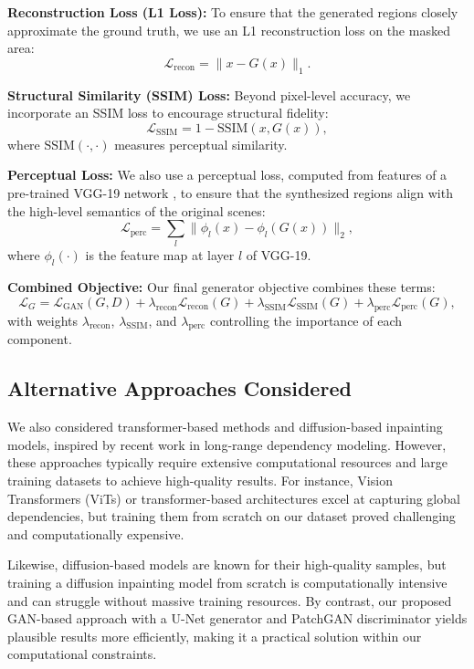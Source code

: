 \documentclass[sigconf]{acmart}
\begin{document}
\noindent\textbf{Reconstruction Loss (L1 Loss):}  
To ensure that the generated regions closely approximate the ground truth, we use an L1 reconstruction loss on the masked area:
\[
\mathcal{L}_{\text{recon}} = \| x - G(x) \|_1.
\]

\noindent\textbf{Structural Similarity (SSIM) Loss:}  
Beyond pixel-level accuracy, we incorporate an SSIM loss to encourage structural fidelity:
\[
\mathcal{L}_{\text{SSIM}} = 1 - \text{SSIM}(x, G(x)),
\]
where $\text{SSIM}(\cdot,\cdot)$ measures perceptual similarity.

\noindent\textbf{Perceptual Loss:}  
We also use a perceptual loss, computed from features of a pre-trained VGG-19 network \cite{Johnson2016}, to ensure that the synthesized regions align with the high-level semantics of the original scenes:
\[
\mathcal{L}_{\text{perc}} = \sum_{l} \| \phi_l(x) - \phi_l(G(x)) \|_2,
\]
where $\phi_l(\cdot)$ is the feature map at layer $l$ of VGG-19.

\noindent\textbf{Combined Objective:}  
Our final generator objective combines these terms:
\[
\mathcal{L}_{G} = \mathcal{L}_{\text{GAN}}(G,D) + \lambda_{\text{recon}}\mathcal{L}_{\text{recon}}(G) + \lambda_{\text{SSIM}}\mathcal{L}_{\text{SSIM}}(G) + \lambda_{\text{perc}}\mathcal{L}_{\text{perc}}(G),
\]
with weights $\lambda_{\text{recon}}$, $\lambda_{\text{SSIM}}$, and $\lambda_{\text{perc}}$ controlling the importance of each component.

\subsection*{Alternative Approaches Considered}

We also considered transformer-based methods and diffusion-based inpainting models, inspired by recent work in long-range dependency modeling. However, these approaches typically require extensive computational resources and large training datasets to achieve high-quality results. For instance, Vision Transformers (ViTs) or transformer-based architectures excel at capturing global dependencies, but training them from scratch on our dataset proved challenging and computationally expensive.

Likewise, diffusion-based models are known for their high-quality samples, but training a diffusion inpainting model from scratch is computationally intensive and can struggle without massive training resources. By contrast, our proposed GAN-based approach with a U-Net generator and PatchGAN discriminator yields plausible results more efficiently, making it a practical solution within our computational constraints.
\end{document}
